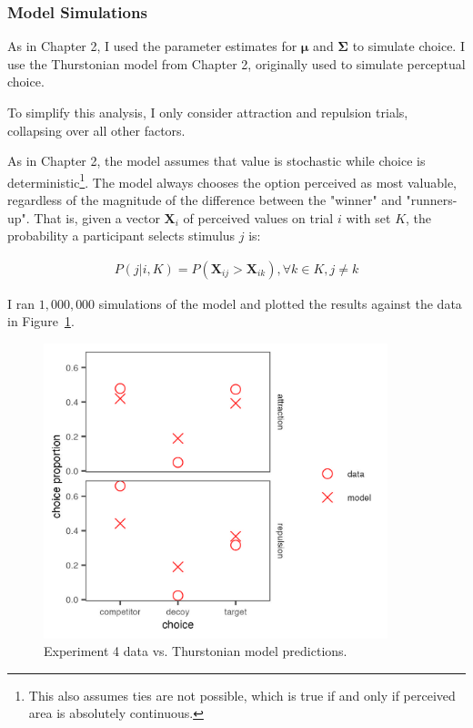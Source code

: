 \subsubsection{Model Simulations}

As in Chapter 2, I used the parameter estimates for $\boldsymbol{\mu}$ and $\boldsymbol{\Sigma}$ to simulate choice. I use the Thurstonian model from Chapter 2, originally used to simulate perceptual choice. 

To simplify this analysis, I only consider attraction and repulsion trials, collapsing over all other factors. 

As in Chapter 2, the model assumes that value is stochastic while choice is deterministic\footnote{This also assumes ties are not possible, which is true if and only if perceived area is absolutely continuous.}. The model always chooses the option perceived as most valuable, regardless of the magnitude of the difference between the "winner" and "runners-up". That is, given a vector $\mathbf{X}_i$ of perceived values on trial $i$ with set $K$, the probability a participant selects stimulus $j$ is:

\begin{align}
   P(j|i,K)=P(\mathbf{X}_{ij}>\mathbf{X}_{ik}), \forall k \in K, j \neq k
   \label{eqn:pchoice_price}
\end{align}

I ran $1,000,000$ simulations of the model and plotted the results against the data in Figure~\ref{fig:bayes_choice_sim_preds}.

\begin{figure}
    \includegraphics[scale=.5,width=100mm]{figures/bayes_choice_sim_preds.jpeg}
    \caption{Experiment 4 data vs. Thurstonian model predictions.}
    \label{fig:bayes_choice_sim_preds}
\end{figure}


